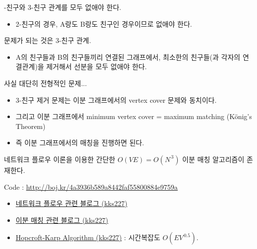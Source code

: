 \documentclass[hyperref={unicode}]{beamer}
\begin{document}
 
    \begin{frame}
        -친구와 3-친구 관계를 모두 없애야 한다.
        \begin{itemize}
        \item<2-> 2-친구의 경우, A랑도 B랑도 친구인 경우이므로 없애야 한다.
        \end{itemize}
         문제가 되는 것은 3-친구 관계.
        \begin{itemize}
            \item<4-> A의 친구들과 B의 친구들끼리 연결된 그래프에서, 최소한의 친구들(과 각자의 연결관계)을 제거해서 선분을 모두 없애야 한다.
        \end{itemize}
    \end{frame}
    
    \begin{frame}
        사실 대단히 전형적인 문제...
        \begin{itemize}
            \item<1-> 3-친구 제거 문제는 이분 그래프에서의 vertex cover 문제와 동치이다.
            \item<2-> 그리고 이분 그래프에서 minimum vertex cover = maximum matching (K\"onig's Theorem)
            \item<3-> 즉 이분 그래프에서의 매칭을 진행하면 된다.
        \end{itemize}
         네트워크 플로우 이론을 이용한 간단한 $ O(VE) = O(N^{\,3}) $ 이분 매칭 알고리즘이 존재한다.
        
    \end{frame}

    \begin{frame}
        Code : \url{http://boj.kr/4a3936b589a8442faf55800884e9759a}
        \begin{itemize}
            \item {\color{blue} \href{https://kks227.blog.me/220804885235}{네트워크 플로우 관련 블로그 (kks227)}}
            \item {\color{blue}\href{https://kks227.blog.me/220807541506}{이분 매칭 관련 블로그 (kks227)}}
            \item {\color{blue} \href{https://kks227.blog.me/220816033373}{Hopcroft-Karp Algorithm (kks227)}} : 시간복잡도 $ O(EV^{\,0.5}) $.
        \end{itemize}
    \end{frame}
\end{document}
